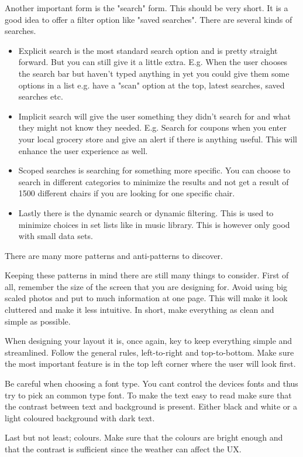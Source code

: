Another important form is the "search" form. This should be very short. It is a good idea to offer a filter option like "saved searches". There are several kinds of searches. %
\begin{itemize}

\item Explicit search is the most standard search option and is pretty straight forward. But you can still give it a little extra. E.g. When the user chooses the search bar but haven't typed anything in yet you could give them some options in a list e.g. have a "scan" option at the top, latest searches, saved searches etc. \cite{Pattern}

\item Implicit search will give the user something they didn't search for and what they might not know they needed. E.g. Search for coupons when you enter your local grocery store and give an alert if there is anything useful. This will enhance the user experience as well. \cite{Pattern}

\item Scoped searches is searching for something more specific. You can choose to search in different categories to minimize the results and not get a result of 1500 different chairs if you are looking for one specific chair. \cite{Pattern}

\item Lastly there is the dynamic search or dynamic filtering. This is used to minimize choices in set lists like in music library. This is however only good with small data sets.\cite{Pattern}

\end{itemize}
There are many more patterns and anti-patterns to discover. \cite{Pattern}

Keeping these patterns in mind there are still many things to consider. 
First of all, remember the size of the screen that you are designing for. Avoid using big scaled photos and put to much information at one page. This will make it look cluttered and make it less intuitive. \cite{Sardo}
In short, make everything as clean and simple as possible. %

When designing your layout it is, once again, key to keep everything simple and streamlined. 
Follow the general rules, left-to-right and top-to-bottom. Make sure the most important feature is in the top left corner where the user will look first.\cite{Sardo} %

Be careful when choosing a font type. You cant control the devices fonts and thus try to pick an common type font.  \cite{Sardo} To make the text easy to read make sure that the contrast between text and background is present. Either black and white or a light coloured background with dark text. \cite{Sardo}%

Last but not least; colours. Make sure that the colours are bright enough and that the contrast is sufficient since the weather can affect the UX. \cite{Sardo} %


